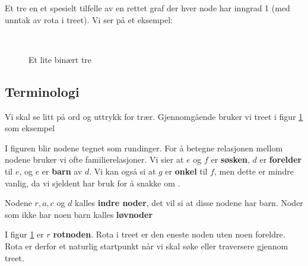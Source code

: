 Et tre en et spesielt tilfelle av en rettet graf der hver node har inngrad 1 (med unntak av rota i treet). Vi ser på et eksempel:
\begin{figure}[h!]
\caption{Et lite binært tre}
\label{fig:tre}
\centering
~\\
\end{figure}

\subsection*{Terminologi}
Vi skal se litt på ord og uttrykk for trær. Gjennomgående bruker vi treet i figur \ref{fig:tre} som eksempel

I figuren blir nodene tegnet som rundinger. For å betegne relasjonen mellom nodene bruker vi ofte familierelasjoner. Vi sier at $ e $ og $ f $ er \textbf{søsken}, $ d $ er \textbf{forelder} til $ e $, og $ e $ er \textbf{barn} av $ d $. Vi kan også si at $ g $ er \textbf{onkel} til $ f $, men dette er mindre vanlig, da vi sjeldent har bruk for å snakke om . 

Nodene $ r, a, c $ og $ d $ kalles \textbf{indre noder}, det vil si at disse nodene har barn. Noder som ikke har noen barn kalles \textbf{løvnoder}

I figur \ref{fig:tre} er $ r $ \textbf{rotnoden}. Rota i treet er den eneste noden uten noen foreldre. Rota er derfor et naturlig startpunkt når vi skal søke eller traversere gjennom treet. 